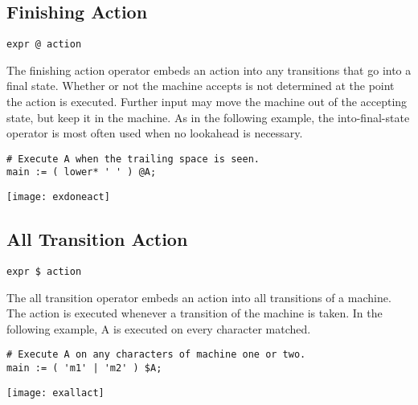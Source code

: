 \documentclass[letterpaper,11pt,oneside]{book}
\newcommand{\verbspace}{\vspace{10pt}}
\newcommand{\graphspace}{\vspace{10pt}}
\newenvironment{inline_code}{\def\baselinestretch{1}\vspace{12pt}\small}{}
\begin{document}
\subsection{Finishing Action}

\verb|expr @ action|
\verbspace

The finishing action operator embeds an action into any transitions that go into a
final state. Whether or not the machine accepts is not determined at the point
the action is executed. Further input may move the machine out of the accepting
state, but keep it in the machine. As in the following example, the
into-final-state operator is most often used when no lookahead is necessary.

\begin{inline_code}
\begin{verbatim}
# Execute A when the trailing space is seen.
main := ( lower* ' ' ) @A;
\end{verbatim}
\end{inline_code}

\graphspace
\begin{center}
\texttt{[image: exdoneact]}
\end{center}
\graphspace


\subsection{All Transition Action}

\verb|expr $ action|
\verbspace

The all transition operator embeds an action into all transitions of a machine.
The action is executed whenever a transition of the machine is taken. In the
following example, A is executed on every character matched.

\begin{inline_code}
\begin{verbatim}
# Execute A on any characters of machine one or two.
main := ( 'm1' | 'm2' ) $A;
\end{verbatim}
\end{inline_code}

\graphspace
\begin{center}
\texttt{[image: exallact]}
\end{center}
\graphspace
\end{document}
